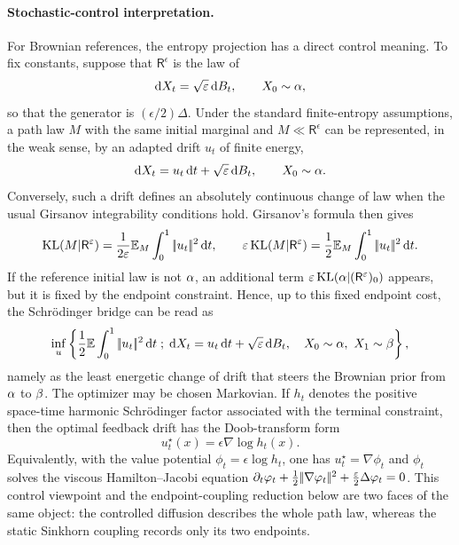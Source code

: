 \paragraph{Stochastic-control interpretation.}
For Brownian references, the entropy projection has a direct control meaning. To fix constants, suppose that $\mathsf R^\epsilon$ is the law of
\[
	\mathrm{d} X_t = \sqrt{\varepsilon}\,\mathrm{d} B_t,
	\qquad
	X_0\sim\alpha,
\]
so that the generator is $(\epsilon/2)\Delta$. Under the standard finite-entropy assumptions, a path law $M$ with the same initial marginal and $M\ll \mathsf R^\epsilon$ can be represented, in the weak sense, by an adapted drift $u_t$ of finite energy,
\[
	\mathrm{d} X_t = u_t\,\mathrm{d} t+\sqrt{\varepsilon}\,\mathrm{d} B_t,
	\qquad
	X_0\sim\alpha.
\]
Conversely, such a drift defines an absolutely continuous change of law when the usual Girsanov integrability conditions hold. Girsanov's formula then gives
\[
	\operatorname{KL}(M|\mathsf R^\varepsilon)
	=
	\frac{1}{2\varepsilon}\mathbb{E}_M\int_0^1 |\!| u_t |\!|^2\,\mathrm{d} t,
	\qquad
	\varepsilon\operatorname{KL}(M|\mathsf R^\varepsilon)=\frac12\mathbb{E}_M\int_0^1 |\!| u_t |\!|^2\,\mathrm{d} t.
\]
	If the reference initial law is not $\alpha$, an additional term $\varepsilon\operatorname{KL}(\alpha|(\mathsf R^\varepsilon)_0)$ appears, but it is fixed by the endpoint constraint. Hence, up to this fixed endpoint cost, the Schr\"odinger bridge can be read as
\[
	\inf_u
	\left\{ 
		\frac12\mathbb{E}\int_0^1|\!| u_t |\!|^2\,\mathrm{d} t
	 \;;\; 
		\mathrm{d} X_t=u_t\,\mathrm{d} t+\sqrt{\varepsilon}\,\mathrm{d} B_t,\quad
		X_0\sim\alpha,\ X_1\sim\beta
	 \right\},
\]
namely as the least energetic change of drift that steers the Brownian prior from $\alpha$ to $\beta$. The optimizer may be chosen Markovian. If $h_t$ denotes the positive space-time harmonic Schr\"odinger factor associated with the terminal constraint, then the optimal feedback drift has the Doob-transform form
\[
	u_t^\star(x)=\epsilon\nabla\log h_t(x).
\]
Equivalently, with the value potential $\phi_t=\epsilon\log h_t$, one has $u_t^\star=\nabla\phi_t$ and $\phi_t$ solves the viscous Hamilton--Jacobi equation $\partial_t\varphi_t+\frac12|\!| \nabla\varphi_t |\!|^2+\frac{\varepsilon}{2}\Delta\varphi_t=0$. This control viewpoint and the endpoint-coupling reduction below are two faces of the same object: the controlled diffusion describes the whole path law, whereas the static Sinkhorn coupling records only its two endpoints.

